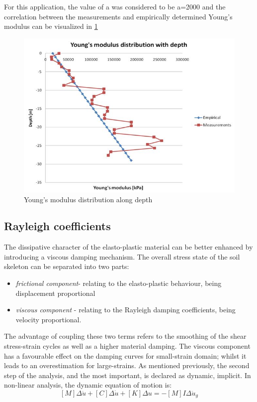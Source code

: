 	For this application, the value of a was considered to be a=2000 and the correlation between the measurements and empirically determined Young's modulus can be visualized in \ref{Young}
	
	\begin{figure}[h!]
		\centering
		\includegraphics[width=0.7\linewidth]{"Young's modulus"}
		\caption[]{Young's modulus distribution along depth}
		\label{Young}
	\end{figure}
	
	\subsection{Rayleigh coefficients}
	The dissipative character of the elasto-plastic material can be better enhanced by introducing a viscous damping mechanism. The overall stress state of the soil skeleton can be separated into two parts: 
	\begin{itemize}
		\item \textit{frictional component}- relating to the elasto-plastic behaviour, being displacement proportional
		\item \textit{viscous component} - relating to the Rayleigh damping coefficients, being velocity proportional. 
	\end{itemize}
	
	The advantage of coupling these two terms refers to the smoothing of the shear stress-strain cycles as well as a higher material damping. The viscous component has a favourable effect on the damping curves for small-strain domain; whilst it leads to an overestimation for large-strains. 
	As mentioned previously, the second step of the analysis, and the most important, is declared as dynamic, implicit. In non-linear analysis, the dynamic equation of motion is:
	\begin{equation}
	\left[M\right]{\Delta \ddot{u}}+\left[C\right]{\Delta \dot{u}}+\left[K\right]\Delta{u}=-\left[M\right]{I}\Delta\ddot{u}_g
	\end{equation}
	
